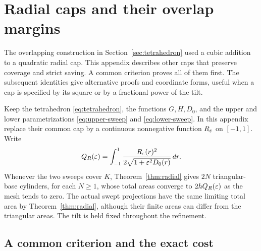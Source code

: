\section{Radial caps and their overlap margins}
\label{sec:cap-choices}

The overlapping construction in Section~\ref{sec:tetrahedron} used a
cubic addition to a quadratic radial cap. This appendix describes other
caps that preserve coverage and strict saving. A common criterion proves
all of them first. The subsequent identities give alternative proofs and
coordinate forms, useful when a cap is specified by its square or by a
fractional power of the tilt.

Keep the tetrahedron \eqref{eq:tetrahedron}, the functions $G,H,D_0$,
and the upper and lower parametrizations \eqref{eq:upper-sweep} and
\eqref{eq:lower-sweep}. In this appendix replace their common cap by a
continuous nonnegative function $R_\varepsilon$ on $[-1,1]$. Write
\begin{equation}\label{eq:general-cap-cost}
 Q_R(\varepsilon)=\int_{-1}^1
 \frac{R_\varepsilon(r)^2}{2\sqrt{1+\varepsilon^2D_0(r)}}\,dr.
\end{equation}
Whenever the two sweeps cover $K$, Theorem~\ref{thm:radial} gives
$2N$ triangular-base cylinders, for each $N\ge1$, whose total areas
converge to $2hQ_R(\varepsilon)$ as the mesh tends to zero. The actual swept
projections have the same limiting total area by Theorem~\ref{thm:radial},
although their finite areas can differ from the triangular areas. The tilt
is held fixed throughout the refinement.

\subsection{A common criterion and the exact cost}

